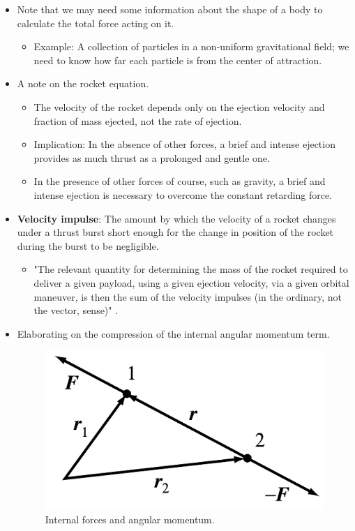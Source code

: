 \documentclass[../notes.tex]{subfiles}
\begin{document}
\begin{itemize}
    \item Note that we may need some information about the shape of a body to calculate the total force acting on it.
    \begin{itemize}
        \item Example: A collection of particles in a non-uniform gravitational field; we need to know how far each particle is from the center of attraction.
    \end{itemize}
    \item A note on the rocket equation.
    \begin{itemize}
        \item The velocity of the rocket depends only on the ejection velocity and fraction of mass ejected, not the rate of ejection.
        \item Implication: In the absence of other forces, a brief and intense ejection provides as much thrust as a prolonged and gentle one.
        \item In the presence of other forces of course, such as gravity, a brief and intense ejection is necessary to overcome the constant retarding force.
    \end{itemize}
    \item \textbf{Velocity impulse}: The amount by which the velocity of a rocket changes under a thrust burst short enough for the change in position of the rocket during the burst to be negligible.
    \begin{itemize}
        \item "The relevant quantity for determining the mass of the rocket required to deliver a given payload, using a given ejection velocity, via a given orbital maneuver, is then the sum of the velocity impulses (in the ordinary, not the vector, sense)" \parencite[180]{bib:KibbleBerkshire}.
    \end{itemize}
    \item Elaborating on the compression of the internal angular momentum term.
    \begin{figure}[h!]
        \centering
        \includegraphics[width=0.25\linewidth]{../ExtFiles/manyBodAngMom.png}
        \caption{Internal forces and angular momentum.}
        \label{fig:manyBodAngMom}
    \end{figure}
    \begin{itemize}

\end{itemize}
\end{itemize}
\end{document}
